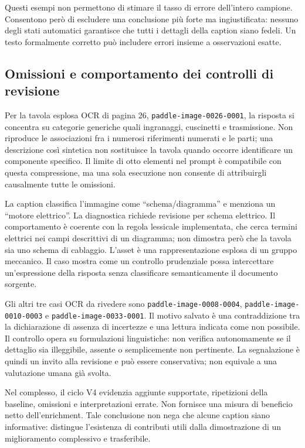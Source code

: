 Questi esempi non permettono di stimare il tasso di errore dell'intero campione. Consentono però di escludere una conclusione più forte ma ingiustificata: nessuno degli stati automatici garantisce che tutti i dettagli della caption siano fedeli. Un testo formalmente corretto può includere errori insieme a osservazioni esatte.

\subsection{Omissioni e comportamento dei controlli di revisione}

Per la tavola esplosa OCR di pagina 26, \texttt{paddle-image-0026-0001}, la risposta si concentra su categorie generiche quali ingranaggi, cuscinetti e trasmissione. Non riproduce le associazioni fra i numerosi riferimenti numerati e le parti; una descrizione così sintetica non sostituisce la tavola quando occorre identificare un componente specifico. Il limite di otto elementi nel prompt è compatibile con questa compressione, ma una sola esecuzione non consente di attribuirgli causalmente tutte le omissioni.

La caption classifica l'immagine come \enquote{schema/diagramma} e menziona un \enquote{motore elettrico}. La diagnostica richiede revisione per schema elettrico. Il comportamento è coerente con la regola lessicale implementata, che cerca termini elettrici nei campi descrittivi di un diagramma; non dimostra però che la tavola sia uno schema di cablaggio. L'asset è una rappresentazione esplosa di un gruppo meccanico. Il caso mostra come un controllo prudenziale possa intercettare un'espressione della risposta senza classificare semanticamente il documento sorgente.

Gli altri tre casi OCR da rivedere sono \texttt{paddle-image-0008-0004}, \texttt{paddle-image-0010-0003} e \texttt{paddle-image-0033-0001}. Il motivo salvato è una contraddizione tra la dichiarazione di assenza di incertezze e una lettura indicata come non possibile. Il controllo opera su formulazioni linguistiche: non verifica autonomamente se il dettaglio sia illeggibile, assente o semplicemente non pertinente. La segnalazione è quindi un invito alla revisione e può essere conservativa; non equivale a una valutazione umana già svolta.

Nel complesso, il ciclo V4 evidenzia aggiunte supportate, ripetizioni della baseline, omissioni e interpretazioni errate. Non fornisce una misura di beneficio netto dell'enrichment. Tale conclusione non nega che alcune caption siano informative: distingue l'esistenza di contributi utili dalla dimostrazione di un miglioramento complessivo e trasferibile.

